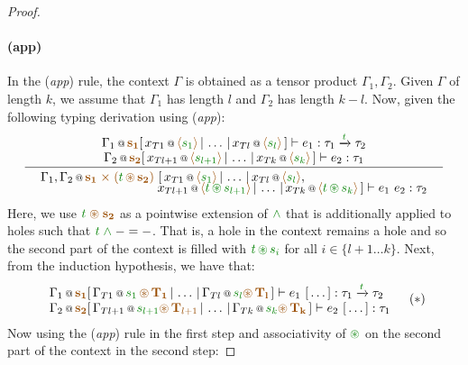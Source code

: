 \begin{proof}
\paragraph{(app)} In the (\emph{app}) rule, the context $\Gamma$ is obtained as a tensor product $\Gamma_1, \Gamma_2$.
  Given $\Gamma$ of length $k$, we assume that $\Gamma_1$ has length $l$ and $\Gamma_2$ has length $k-l$. 
  Now, given the following typing derivation using (\emph{app}):
\[
\inference
  {\coctx{\Gamma_1}{\aclrd{\mathbf{s_1}}} 
   [\,\coctx{x_{T1}}{\alift{\cclrd{s_1}}} \,|\, \ldots \,|\, \coctx{x_{Tl}}{\alift{\cclrd{s_l}}}\,] 
      \vdash e_1 : \tau_1 \xrightarrow{\cclrd{t}} \tau_2 \\
   \coctx{\Gamma_2}{\aclrd{\mathbf{s_2}}} 
   [\,\coctx{x_{Tl+1}}{\alift{\cclrd{s_{l+1}}}} \,|\, \ldots \,|\, \coctx{x_{Tk}}{\alift{\cclrd{s_k}}}\,]
      \vdash e_2 : \tau_1 }
  { \begin{array}{l}
    \coctx{\Gamma_1, \Gamma_2}{\aclrd{\mathbf{s_1}\;\atimes\;(\cclrd{t} \,\aseq\, \aclrd{\mathbf{s_2}})}}~
     [\,\coctx{x_{T1}}{\alift{\cclrd{s_1}}} \,|\, \ldots \,|\, \coctx{x_{Tl}}{\alift{\cclrd{s_l}}}, \\[-0.35em] \hspace{9.3em}
       \coctx{x_{Tl+1}}{\alift{\cclrd{t} \,\cseq\, \cclrd{s_{l+1}}}} \,|\, \ldots \,|\, 
          \coctx{x_{Tk}}{\alift{\cclrd{t} \,\cseq\, \cclrd{s_k}}}\,] \vdash e_1~e_2 : \tau_2 
    \end{array} }
\]
Here, we use $\cclrd{t}\;\aseq\;\aclrd{\mathbf{s_2}}$ as a pointwise extension of $\czip$ that is additionally
applied to holes such that $\cclrd{t}\;\czip\; - = -$. That is, a hole in the context remains a hole and so
the second part of the context is filled with $\cclrd{t} \,\cseq\, \cclrd{s_i}$ for all $i \in \{ l+1 \ldots k \}$.
Next, from the induction hypothesis, we have that:
\[
\begin{array}{l}
 \coctx{\Gamma_1}{\aclrd{\mathbf{s_1}}} 
   [\,\coctx{\Gamma_{T1}}{\cclrd{s_1}\,\aseq\,\aclrd{\mathbf{T_1}}} \,|\, \ldots \,|\, \coctx{\Gamma_{Tl}}{\cclrd{s_l}\aseq\,\aclrd{\mathbf{T_l}}}\,] 
   \vdash e_1~[\,\ldots\,] : \tau_1 \xrightarrow{\cclrd{t}} \tau_2 \\
 \coctx{\Gamma_2}{\aclrd{\mathbf{s_{2}}}} 
   [\,\coctx{\Gamma_{Tl+1}}{\cclrd{s_{l+1}}\aseq\,\aclrd{\mathbf{T}_{l+1}}} \,|\, \ldots \,|\, \coctx{\Gamma_{Tk}}{\cclrd{s_k}\aseq\,\aclrd{\mathbf{T_k}}}\,]
   \vdash e_2~[\,\ldots\,] : \tau_1
\end{array}\quad(*)
\]
Now using the (\emph{app}) rule in the first step and associativity of $\cseq$ on the second part of the context in the second step:

\end{proof}
